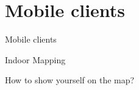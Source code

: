\documentclass[11pt]{beamer}
\begin{document}
\section{Mobile clients}


\begin{frame}{}

  \begin{center}

    {\Huge Mobile clients}

  \end{center}

\end{frame}


\begin{frame}{Indoor Mapping}


    How to show yourself on the map?


\end{frame}
\end{document}
